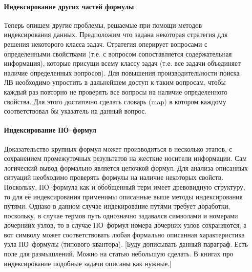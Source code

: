 \paragraph{Индексирование других частей формулы}
Теперь опишем другие проблемы, решаемые при помощи методов индексирования данных. Предположим что  задана некоторая стратегия для решения некоторого класса задач. Стратегия оперирует вопросами с определенными свойствами (т.е. с вопросом сопоставляется содержательная информация), которые присущи всему классу задач (т.е. все задачи объединяет наличие определенных вопросов). Для повышения производительности поиска ЛВ необходимо упростить в дальнейшем доступ к таким вопросам, чтобы каждый раз повторно не проверять все вопросы на наличие определенного свойства. Для этого достаточно сделать словарь (map) в котором каждому  соответствовал бы указатель на данный вопрос. 


\paragraph{Индексирование ПО--формул} Доказательство крупных формул может производиться в несколько этапов, с сохранением промежуточных результатов на жесткие носители информации. Сам логический вывод формально является цепочкой формул. Для анализа описанных ситуаций необходимо проверять формулы на наличие некоторых свойств. Поскольку, ПО--формула как и обобщенный терм имеет древовидную структуру, то для её индексирования применимы описанные выше методы индексирования путями. Однако в данном случае индекирование путями требует доработки, поскольку, в случае термов путь однозначно задавался символами и номерами дочерниих узлов, то в случае ПО--формул номера дочерних узлов сохраняются, а вот символу может соответствовать любая формально описанная характеристика узла ПО--формулы (типового квантора). [Буду дописывать данный параграф. Есть поле для размышлений. Можно на статью небольшую сделать. В книгах про индексирование подобные задачи описаны как нужные.]


